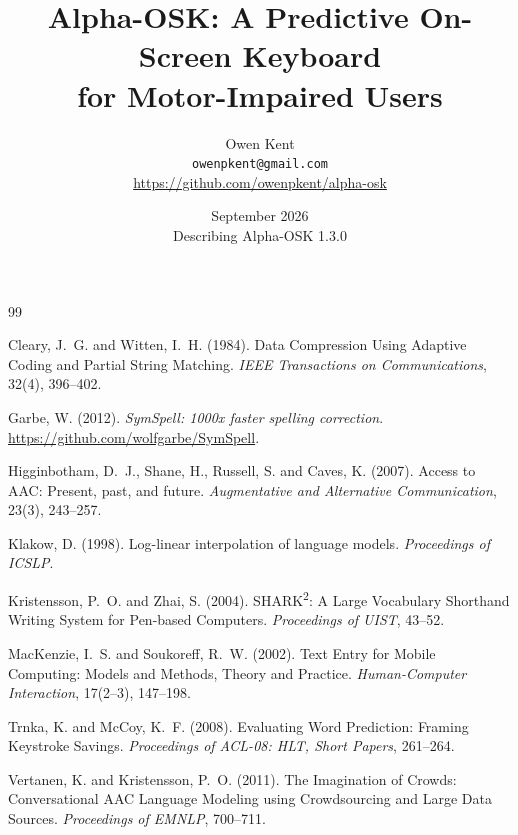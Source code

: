 \documentclass[11pt,a4paper]{article}
\title{\bfseries Alpha-OSK: A Predictive On-Screen Keyboard\\for Motor-Impaired Users}
\author{Owen Kent\\[.3em]
  \normalsize\texttt{owenpkent@gmail.com}\\
  \normalsize\url{https://github.com/owenpkent/alpha-osk}}
\date{September 2026\\[.3em]
  \normalsize Describing Alpha-OSK 1.3.0}
\begin{document}
\maketitle

\begin{abstract}

\end{abstract}

\tableofcontents
\bigskip




\begin{thebibliography}{99}

Cleary, J.~G. and Witten, I.~H. (1984).
Data Compression Using Adaptive Coding and Partial String Matching.
\emph{IEEE Transactions on Communications}, 32(4), 396--402.

Garbe, W. (2012).
\emph{SymSpell: 1000x faster spelling correction}.
\url{https://github.com/wolfgarbe/SymSpell}.

Higginbotham, D.~J., Shane, H., Russell, S. and Caves, K. (2007).
Access to AAC: Present, past, and future.
\emph{Augmentative and Alternative Communication}, 23(3), 243--257.

Klakow, D. (1998).
Log-linear interpolation of language models.
\emph{Proceedings of ICSLP}.

Kristensson, P.~O. and Zhai, S. (2004).
SHARK\textsuperscript{2}: A Large Vocabulary Shorthand Writing System for Pen-based Computers.
\emph{Proceedings of UIST}, 43--52.

MacKenzie, I.~S. and Soukoreff, R.~W. (2002).
Text Entry for Mobile Computing: Models and Methods, Theory and Practice.
\emph{Human-Computer Interaction}, 17(2--3), 147--198.

Trnka, K. and McCoy, K.~F. (2008).
Evaluating Word Prediction: Framing Keystroke Savings.
\emph{Proceedings of ACL-08: HLT, Short Papers}, 261--264.

Vertanen, K. and Kristensson, P.~O. (2011).
The Imagination of Crowds: Conversational AAC Language Modeling using Crowdsourcing and Large Data Sources.
\emph{Proceedings of EMNLP}, 700--711.


\end{thebibliography}
\end{document}
